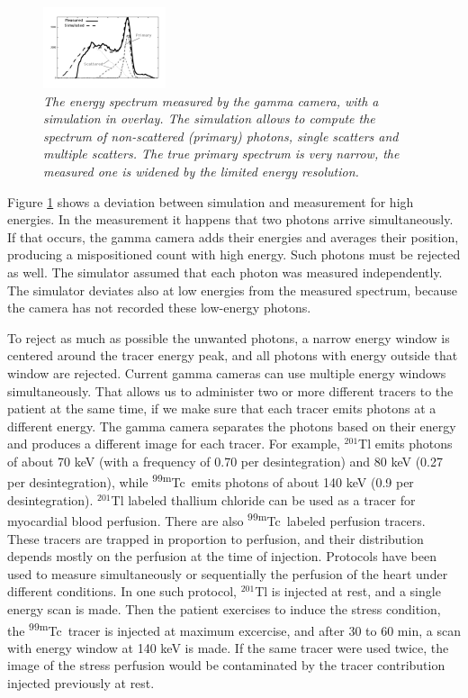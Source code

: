 \begin{figure}[tb]
\centering
\includegraphics[width=\figone]{figs/fig_scatter_spectrum.pdf}
\caption{\label{fig:scatter_spectrum} \emph{The energy spectrum measured by
the gamma camera, with a simulation in overlay. The simulation allows to
compute the spectrum of non-scattered (primary) photons, single scatters and
multiple scatters. The true primary spectrum is very narrow, the measured one
is widened by the limited energy resolution.}}
\end{figure}

Figure \ref{fig:scatter_spectrum} shows a deviation between simulation and
measurement for high energies. In the measurement it happens that two photons
arrive simultaneously. If that occurs, the gamma camera adds their energies
and averages their position, producing a mispositioned count with high
energy. Such photons must be rejected as well. The simulator assumed
that each photon was measured independently. The simulator deviates also at
low energies from the measured spectrum, because the camera has not recorded
these low-energy photons.

To reject as much as possible the unwanted photons, a narrow energy
window is centered around the tracer energy peak, and all photons with
energy outside that window are rejected. Current gamma cameras can use
multiple energy windows simultaneously. That allows us to administer
two or more different tracers to the patient at the same time, if we
make sure that each tracer emits photons at a different energy. The
gamma camera separates the photons based on their energy and produces
a different image for each tracer. For example, $^{201}$Tl emits
photons of about 70 keV (with a frequency of 0.70 per desintegration)
and 80 keV (0.27 per desintegration), while \textsuperscript{99m}Tc\ emits photons
of about 140 keV (0.9 per desintegration). $^{201}$Tl labeled thallium
chloride can be used as a tracer for myocardial blood perfusion. There
are also \textsuperscript{99m}Tc\ labeled perfusion tracers. These tracers are
trapped in proportion to perfusion, and their distribution depends
mostly on the perfusion at the time of injection.  Protocols have been
used to measure simultaneously or sequentially the perfusion of the
heart under different conditions. In one such protocol, $^{201}$Tl is
injected at rest, and a single energy scan is made. Then the patient
exercises to induce the stress condition, the \textsuperscript{99m}Tc\ tracer is
injected at maximum excercise, and after 30 to 60 min, a scan with
energy window at 140 keV is made. If the same tracer were used twice,
the image of the stress perfusion would be contaminated by the tracer
contribution injected previously at rest.

